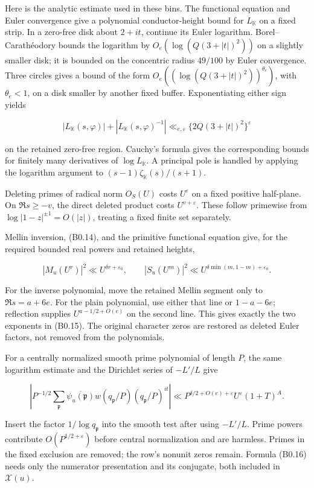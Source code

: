 \documentclass[11pt,a4paper]{article}
\begin{document}
Here is the analytic estimate used in these bins. The functional
equation and Euler convergence give a polynomial conductor-height bound
for \(L_{\mathbb K}\) on a fixed strip. In a zero-free disk about
\(2+it\), continue its Euler logarithm. Borel--Carathéodory bounds the
logarithm by \(O_e(\log(Q(3+|t|)^2))\) on a slightly smaller disk; it is
bounded on the concentric radius \(49/100\) by Euler convergence. Three
circles gives a bound of the form
\(O_e((\log(Q(3+|t|)^2))^{\theta_e})\), with \(\theta_e<1\), on a disk
smaller by another fixed buffer. Exponentiating either sign yields

\[
|L_{\mathbb K}(s,\varphi)|+|L_{\mathbb K}(s,\varphi)^{-1}|
\ll_{e,\varepsilon}\{2Q(3+|t|)^2\}^{\varepsilon}
\tag{B0.14}
\]

on the retained zero-free region. Cauchy's formula gives the
corresponding bounds for finitely many derivatives of
\(\log L_{\mathbb K}\). A principal pole is handled by applying the
logarithm argument to \((s-1)\zeta_{\mathbb K}(s)/(s+1)\).

Deleting primes of radical norm \(O_S(U)\) costs \(U^\varepsilon\) on a
fixed positive half-plane. On \(\Re s\ge-v\), the direct deleted product
costs \(U^{v+\varepsilon}\). These follow primewise from
\(\log|1-z|^{\pm1}=O(|z|)\), treating a fixed finite set separately.

Mellin inversion, (B0.14), and the primitive functional equation give,
for the required bounded real powers and retained heights,

\[
|M_u(U^r)|^2\ll U^{\delta r+\varepsilon_0},\qquad
|S_u(U^m)|^2\ll U^{\delta\min(m,1-m)+\varepsilon_0}.
\tag{B0.15}
\]

For the inverse polynomial, move the retained Mellin segment only to
\(\Re s=a+6e\). For the plain polynomial, use either that line or
\(1-a-6e\); reflection supplies \(U^{a-1/2+O(e)}\) on the second line.
This gives exactly the two exponents in (B0.15). The original character
zeros are restored as deleted Euler factors, not removed from the
polynomials.

For a centrally normalized smooth prime polynomial of length \(P\), the
same logarithm estimate and the Dirichlet series of \(-L'/L\) give

\[
\left|P^{-1/2}\sum_{\mathfrak p}\overline{\psi_u(\mathfrak p)}
w(q_{\mathfrak p}/P)(q_{\mathfrak p}/P)^{it}\right|
\ll P^{\delta/2+O(e)+\varepsilon}U^\varepsilon(1+T)^A.
\tag{B0.16}
\]

Insert the factor \(1/\log q_{\mathfrak p}\) into the smooth test after
using \(-L'/L\). Prime powers contribute \(O(P^{1/2+\varepsilon})\)
before central normalization and are harmless. Primes in the fixed
exclusion are removed; the row's nonunit zeros remain. Formula (B0.16)
needs only the numerator presentation and its conjugate, both included
in \(\mathcal X(u)\).
\end{document}
